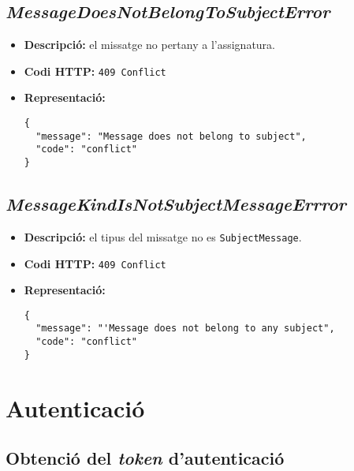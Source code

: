 \subsection{\emph{MessageDoesNotBelongToSubjectError}}
\begin{itemize}
	\item \textbf{Descripció:} el missatge no pertany a l'assignatura.
	\item \textbf{Codi \ac{HTTP}:} \texttt{409 Conflict}
	\item \textbf{Representació:}
\begin{verbatim}
{
  "message": "Message does not belong to subject",
  "code": "conflict"
}
\end{verbatim}
\end{itemize}
\subsection{\emph{MessageKindIsNotSubjectMessageErrror}}
\begin{itemize}
	\item \textbf{Descripció:} el tipus del missatge no es \texttt{SubjectMessage}.
	\item \textbf{Codi \ac{HTTP}:} \texttt{409 Conflict}
	\item \textbf{Representació:}
\begin{verbatim}
{
  "message": "'Message does not belong to any subject",
  "code": "conflict"
}
\end{verbatim}
\end{itemize}
\section{Autenticació}

\subsection{Obtenció del \emph{token} d'autenticació}

